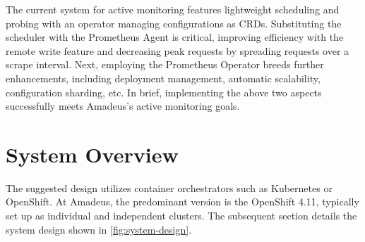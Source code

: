 The current system for active monitoring features lightweight scheduling and probing with an operator managing configurations as \ac{CRD}s. Substituting the scheduler with the Prometheus Agent is critical, improving efficiency with the remote write feature and decreasing peak requests by spreading requests over a scrape interval. Next, employing the Prometheus Operator breeds further enhancements, including deployment management, automatic scalability, configuration sharding, etc. In brief, implementing the above two aspects successfully meets Amadeus's active monitoring goals. 

\section{System Overview}

The suggested design utilizes container orchestrators such as Kubernetes or OpenShift. At Amadeus, the predominant version is the OpenShift 4.11, typically set up as individual and independent clusters. The subsequent section details the system design shown in \autoref{fig:system-design}. 

